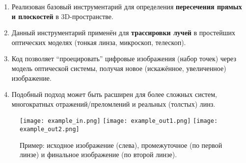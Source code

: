 \documentclass[a4paper,12pt]{article}
\begin{document}
\begin{enumerate}
  \item Реализован базовый инструментарий для определения \textbf{пересечения прямых и плоскостей} в 3D-пространстве.
  \item Данный инструментарий применён для \textbf{трассировки лучей} в простейших оптических моделях (тонкая линза, микроскоп, телескоп).
  \item Код позволяет ``проецировать'' цифровые изображения (набор точек) через модель оптической системы, получая новое (искажённое, увеличенное) изображение.
  \item Подобный подход может быть расширен для более сложных систем, многократных отражений/преломлений и реальных (толстых) линз.
\end{enumerate}

\begin{figure}[h!]
  \centering
  \texttt{[image: example\_in.png]}
  \texttt{[image: example\_out1.png]}
  \texttt{[image: example\_out2.png]}
  \caption{Пример: исходное изображение (слева), промежуточное (по первой линзе) и финальное изображение (по второй линзе).}
  \label{fig:lens_in}
\end{figure}
\end{document}
